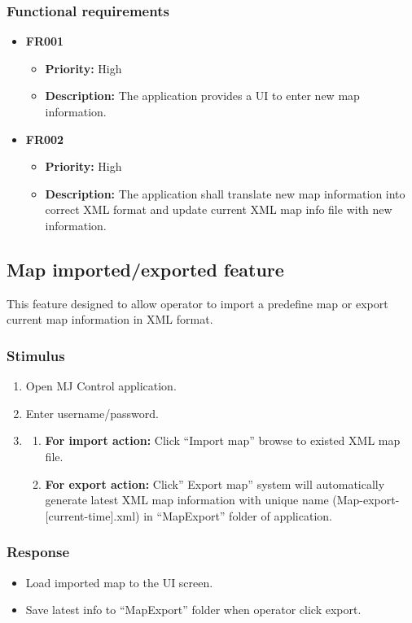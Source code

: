 \documentclass[10pt,a4paper,titlepage]{article}
\begin{document}
	\subsubsection*{Functional requirements}
	\begin{itemize}
		\item \textbf{FR001} 
		\begin{itemize}
			\item \textbf{Priority:} High
			\item \textbf{Description:} The application provides a UI to enter new map information.
		\end{itemize}
		\item \textbf{FR002}
		\begin{itemize}
			\item \textbf{Priority:} High
			\item \textbf{Description:} The application shall translate new map information into correct XML format and update current XML map info file with new information.
		\end{itemize}
	\end{itemize}
	
	\subsection{Map imported/exported feature}
	This feature designed to allow operator to import a predefine map or export current map information in XML format.
	
	\subsubsection*{Stimulus}
	\begin{enumerate}
		\item Open MJ Control application.
		\item Enter username/password.
		\item 
		\begin{enumerate} 
			\item \textbf{For import action:} Click “Import map” browse to existed XML map file.
			\item \textbf{For export action:} Click” Export map” system will automatically generate latest XML map information with unique name (Map-export-[current-time].xml) in “MapExport” folder of application.
		\end{enumerate} 
	\end{enumerate}
	
	\subsubsection*{Response}
	\begin{itemize}
		\item Load imported map to the UI screen.
		\item Save latest info to “MapExport” folder when operator click export.
	\end{itemize}
	
\end{document}
